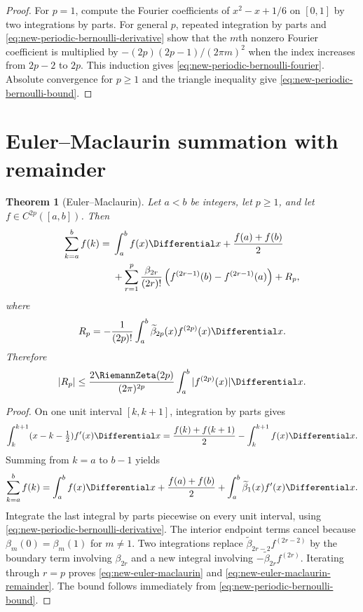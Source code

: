 \documentclass[11pt,a4paper,oneside,openany]{book}
\newtheorem{theorem}{Theorem}[chapter]
\theoremstyle{definition}
\theoremstyle{remark}
\begin{document}
\begin{proof}
For $p=1$, compute the Fourier coefficients of
$x^2-x+1/6$ on $[0,1]$ by two integrations by parts.  For general $p$,
repeated integration by parts and
\eqref{eq:new-periodic-bernoulli-derivative} show that the $m$th nonzero
Fourier coefficient is multiplied by
$-(2p)(2p-1)/(2\pi m)^2$ when the index increases from $2p-2$ to $2p$.
This induction gives \eqref{eq:new-periodic-bernoulli-fourier}.  Absolute
convergence for $p\ge1$ and the triangle inequality give
\eqref{eq:new-periodic-bernoulli-bound}.
\end{proof}

\section{Euler--Maclaurin summation with remainder}

\begin{theorem}[Euler--Maclaurin]\label{thm:new-euler-maclaurin}
Let $a<b$ be integers, let $p\ge1$, and let $f\in C^{2p}([a,b])$.  Then
\begin{align}
 \sum_{k=a}^{b}f(k)
={}&\int_a^bf(x)\Differential x+\frac{f(a)+f(b)}2
 \notag\\
 &+\sum_{r=1}^{p}\frac{\beta_{2r}}{(2r)!}
 \left(f^{(2r-1)}(b)-f^{(2r-1)}(a)\right)+R_p,
 \label{eq:new-euler-maclaurin}
\end{align}
where
\begin{equation}\label{eq:new-euler-maclaurin-remainder}
 R_p=-\frac1{(2p)!}\int_a^b
 \widetilde\beta_{2p}(x)f^{(2p)}(x)\Differential x.
\end{equation}
Therefore
\begin{equation}\label{eq:new-euler-maclaurin-bound}
 |R_p|\le
 \frac{2\RiemannZeta(2p)}{(2\pi)^{2p}}
 \int_a^b|f^{(2p)}(x)|\Differential x.
\end{equation}
\end{theorem}

\begin{proof}
On one unit interval $[k,k+1]$, integration by parts gives
\[
 \int_k^{k+1}(x-k-\tfrac12)f'(x)\Differential x
 =\frac{f(k)+f(k+1)}2-\int_k^{k+1}f(x)\Differential x.
\]
Summing from $k=a$ to $b-1$ yields
\begin{equation}\label{eq:new-em-first-step}
 \sum_{k=a}^{b}f(k)
 =\int_a^bf(x)\Differential x+\frac{f(a)+f(b)}2
 +\int_a^b\widetilde\beta_1(x)f'(x)\Differential x.
\end{equation}
Integrate the last integral by parts piecewise on every unit interval, using
\eqref{eq:new-periodic-bernoulli-derivative}.  The interior endpoint terms
cancel because $\beta_m(0)=\beta_m(1)$ for $m\ne1$.  Two integrations replace
$\widetilde\beta_{2r-2}f^{(2r-2)}$ by the boundary term involving
$\beta_{2r}$ and a new integral involving
$-\widetilde\beta_{2r}f^{(2r)}$.  Iterating through $r=p$ proves
\eqref{eq:new-euler-maclaurin} and
\eqref{eq:new-euler-maclaurin-remainder}.  The bound follows immediately from
\eqref{eq:new-periodic-bernoulli-bound}.
\end{proof}
\end{document}
